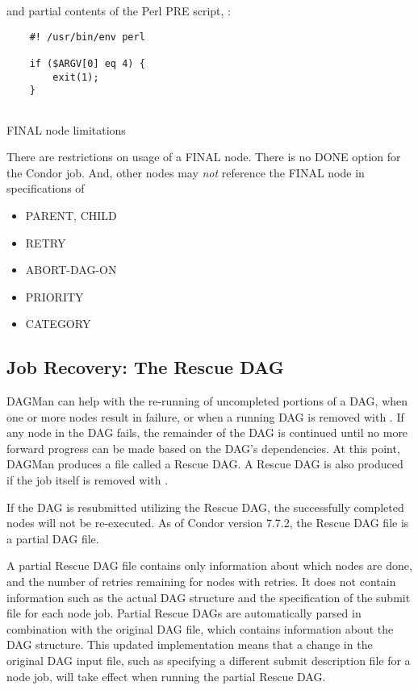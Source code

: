 and partial contents of the Perl PRE script, :
\begin{verbatim}
    #! /usr/bin/env perl
    
    if ($ARGV[0] eq 4) {
        exit(1);
    }
   
\end{verbatim}


\begin{description}
\item[FINAL node limitations]
\end{description}

There are restrictions on usage of a FINAL node.
There is no DONE option for the Condor job.
And, other nodes may \emph{not} reference the FINAL node in specifications of 
\begin{itemize}
\item PARENT, CHILD
\item RETRY
\item ABORT-DAG-ON
\item PRIORITY
\item CATEGORY
\end{itemize}

\subsection{\label{sec:DAGMan-rescue}Job Recovery:  The Rescue DAG}

DAGMan can help with the re-running of uncompleted portions of a DAG, 
when one or more nodes result in failure,
or when a running DAG is removed with .
If any node in the DAG fails,
the remainder of the DAG is continued until no more forward
progress can be made based on the DAG's dependencies.
At this point, DAGMan produces a file called a Rescue DAG.  
A Rescue DAG is also produced if the
 job itself is removed with .

If the DAG is resubmitted utilizing the Rescue DAG,
the successfully completed nodes will not be re-executed.
As of Condor version 7.7.2, the Rescue DAG file is a partial DAG file. 

A partial Rescue DAG file contains only information about which nodes are done,
and the number of retries remaining for nodes with retries.  
It does not contain information such as the actual
DAG structure and the specification of the submit file for each node job.  
Partial Rescue DAGs are automatically parsed in combination with
the original DAG file, 
which contains information about the DAG structure.  
This updated implementation means that a change in the original DAG input file,
such as specifying a different submit description file for a node job,
will take effect when running the partial Rescue DAG.

